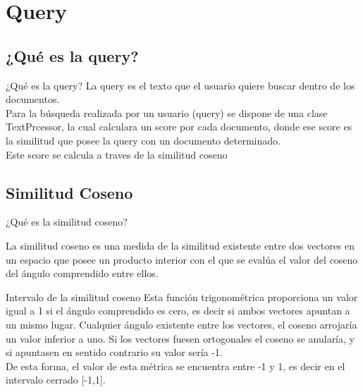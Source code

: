 \section{Query}\label{sec:query}

\subsection{¿Qué es la query?}
\begin{frame}{¿Qué es la query?}
        La query es el texto que el usuario quiere buscar dentro de los documentos.\\
        \pause  \vspace*{0.3cm}     
        Para la búsqueda realizada por un usuario (query) se dispone de una clase TextPrcessor,
        la cual calculara un score por cada documento, donde ese score es la similitud que
        posee la query con un documento determinado.\\
        \pause \vspace*{0.3cm}
        Este score se calcula a traves de la similitud coseno
\end{frame}

\subsection{Similitud Coseno}
\begin{frame}{¿Qué es la similitud coseno?}
        \begin{center}
                La similitud coseno es una medida de la similitud existente entre dos vectores en un espacio 
                que posee un producto interior con el que se evalúa el valor del coseno del ángulo comprendido 
                entre ellos.
        \end{center}
\end{frame}

\begin{frame}{Intervalo de la similitud coseno}
        Esta función trigonométrica proporciona un valor igual a 1 si el ángulo comprendido es cero,
        es decir si ambos vectores apuntan a un mismo lugar. \pause
        Cualquier ángulo existente entre los vectores, el coseno arrojaría un valor inferior a uno. \pause
        Si los vectores fuesen ortogonales el coseno se anularía, \pause
        y si apuntasen en sentido contrario su valor sería -1. \\
        \pause \vspace*{0.3cm}
        De esta forma, el valor de esta métrica se encuentra entre -1 y 1, es decir en el intervalo cerrado [-1,1].
\end{frame}

